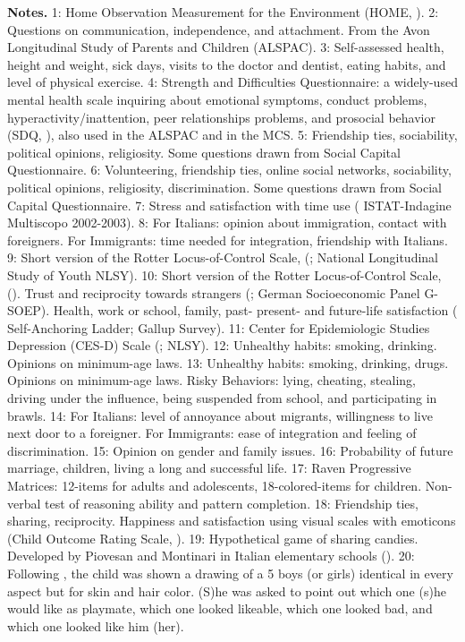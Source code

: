  \tiny{{\bfseries Notes.} 1: Home Observation Measurement for the Environment (HOME, \cite{Caldwell1984}). 2: Questions on communication, independence, and attachment. From the Avon Longitudinal Study of Parents and Children (ALSPAC). 3: Self-assessed health, height and weight, sick days, visits to the doctor and dentist, eating habits, and level of physical exercise. 4: Strength and Difficulties Questionnaire: a widely-used mental health scale inquiring about emotional symptoms, conduct problems, hyperactivity/inattention, peer relationships problems, and prosocial behavior (SDQ, \cite{Goodman1997}), also used in the ALSPAC and in the MCS. 5: Friendship ties, sociability, political opinions, religiosity. Some questions drawn from \cite{Onyx2000} Social Capital Questionnaire. 6: Volunteering, friendship ties, online social networks, sociability, political opinions, religiosity, discrimination. Some questions drawn from \cite{Onyx2000} Social Capital Questionnaire. 7: Stress and satisfaction with time use (\cite{ISTAT} ISTAT-Indagine Multiscopo 2002-2003). 8: For Italians: opinion about immigration, contact with foreigners. For Immigrants: time needed for integration, friendship with Italians. 9: Short version of the Rotter Locus-of-Control Scale, (\cite{Rotter1966}; National Longitudinal Study of Youth NLSY). 10: Short version of the Rotter Locus-of-Control Scale, (\cite{Rotter1966}). Trust and reciprocity towards strangers (\cite{Dohmen2008}; German Socioeconomic Panel G-SOEP). Health, work or school, family, past- present- and future-life satisfaction (\cite{Cantril1965} Self-Anchoring Ladder; Gallup Survey). 11: Center for Epidemiologic Studies Depression (CES-D) Scale (\cite{Radloff1977}; NLSY). 12: Unhealthy habits: smoking, drinking. Opinions on minimum-age laws. 13: Unhealthy habits: smoking, drinking, drugs. Opinions on minimum-age laws. Risky Behaviors: lying, cheating, stealing, driving under the influence, being suspended from school, and participating in brawls. 14: For Italians: level of annoyance about migrants, willingness to live next door to a foreigner. For Immigrants: ease of integration and feeling of discrimination. 15: Opinion on gender and family issues. 16: Probability of future marriage, children, living a long and successful life. 17: Raven Progressive Matrices: 12-items for adults and adolescents, 18-colored-items for children. Non-verbal test of reasoning ability and pattern completion. 18: Friendship ties, sharing, reciprocity. Happiness and satisfaction using visual scales with emoticons (Child Outcome Rating Scale, \cite{Duncan2003a}). 19: Hypothetical game of sharing candies. Developed by Piovesan and Montinari in Italian elementary schools (\cite{Shaw2014}). 20: Following \cite{Clark1947}, the child was shown a drawing of a 5 boys (or girls) identical in every aspect but for skin and hair color. (S)he was asked to point out which one (s)he would like as playmate, which one looked likeable, which one looked bad, and which one looked like him (her).}
